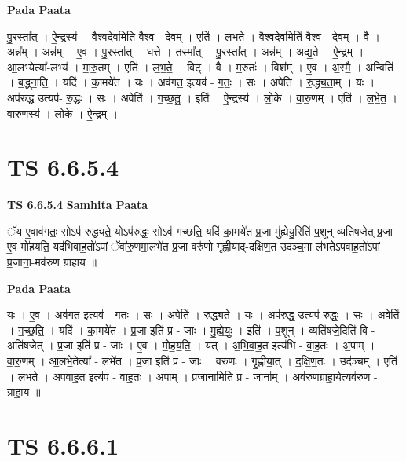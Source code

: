 \documentclass[17pt]{extarticle}
\begin{document}
\textbf{Pada Paata} \newline

पु॒रस्ता᳚त् । ऐ॒न्द्रस्य॑ । वै॒श्व॒दे॒वमिति॑ वैश्व - दे॒वम् । एति॑ । ल॒भ॒ते॒ । वै॒श्व॒दे॒वमिति॑ वैश्व - दे॒वम् । वै । अन्न᳚म् । अन्न᳚म् । ए॒व । पु॒रस्ता᳚त् । ध॒त्ते॒ । तस्मा᳚त् । पु॒रस्ता᳚त् । अन्न᳚म् । अ॒द्य॒ते॒ । ऐ॒न्द्रम् । आ॒लभ्येत्या᳚-लभ्य॑ । मा॒रु॒तम् । एति॑ । ल॒भ॒ते॒ । विट् । वै । म॒रुतः॑ । विश᳚म् । ए॒व । अ॒स्मै॒ । अन्विति॑ । ब॒द्ध्ना॒ति॒ । यदि॑ । का॒मये॑त । यः । अव॑गत॒ इत्यव॑ - ग॒तः॒ । सः । अपेति॑ । रु॒द्ध्य॒ता॒म् । यः । अप॑रुद्ध॒ उत्यप॑- रु॒द्धः॒ । सः । अवेति॑ । ग॒च्छ॒तु॒ । इति॑ । ऐ॒न्द्रस्य॑ । लो॒के । वा॒रु॒णम् । एति॑ । ल॒भे॒त॒ । वा॒रु॒णस्य॑ । लो॒के । ऐ॒न्द्रम् ।  \newline




\section*{ TS 6.6.5.4 }

\textbf{TS 6.6.5.4 } \newline
\textbf{Samhita Paata} \newline

ॅय ए॒वाव॑गतः॒ सोऽप॑ रुद्ध्यते॒ योऽप॑रुद्धः॒ सोऽव॑ गच्छति॒ यदि॑ का॒मये॑त प्र॒जा मु॑ह्येयु॒रिति॑ प॒शून् व्यति॑षजेत् प्र॒जा ए॒व मो॑हयति॒ यद॑भिवाह॒तो॑ऽपां ॅवा॑रु॒णमा॒लभे॑त प्र॒जा वरु॑णो गृह्णीयाद्-दक्षिण॒त उद॑ञ्च॒मा ल॑भतेऽपवाह॒तो॑ऽपां प्र॒जाना॒-मव॑रुण ग्राहाय ॥ \newline

\textbf{Pada Paata} \newline

यः । ए॒व । अव॑गत॒ इत्यव॑ - ग॒तः॒ । सः । अपेति॑ । रु॒द्ध्य॒ते॒ । यः । अप॑रुद्ध॒ उत्यप॑-रु॒द्धः॒ । सः । अवेति॑ । ग॒च्छ॒ति॒ । यदि॑ । का॒मये॑त । प्र॒जा इति॑ प्र - जाः । मु॒ह्ये॒युः॒ । इति॑ । प॒शून् । व्यति॑षजे॒दिति॑ वि - अति॑षजेत् । प्र॒जा इति॑ प्र - जाः । ए॒व । मो॒ह॒य॒ति॒ । यत् । अ॒भि॒वा॒ह॒त इत्य॑भि - वा॒ह॒तः । अ॒पाम् । वा॒रु॒णम् । आ॒लभे॒तेत्या᳚ - लभे॑त । प्र॒जा इति॑ प्र - जाः । वरु॑णः । गृ॒ह्णी॒या॒त् । द॒क्षि॒ण॒तः । उद॑ञ्चम् । एति॑ । ल॒भ॒ते॒ । अ॒प॒वा॒ह॒त इत्य॑प - वा॒ह॒तः । अ॒पाम् । प्र॒जाना॒मिति॑ प्र - जाना᳚म् । अव॑रुणग्राहा॒येत्यव॑रुण - ग्रा॒हा॒य॒ ॥  \newline




\section*{ TS 6.6.6.1 }
\end{document}
